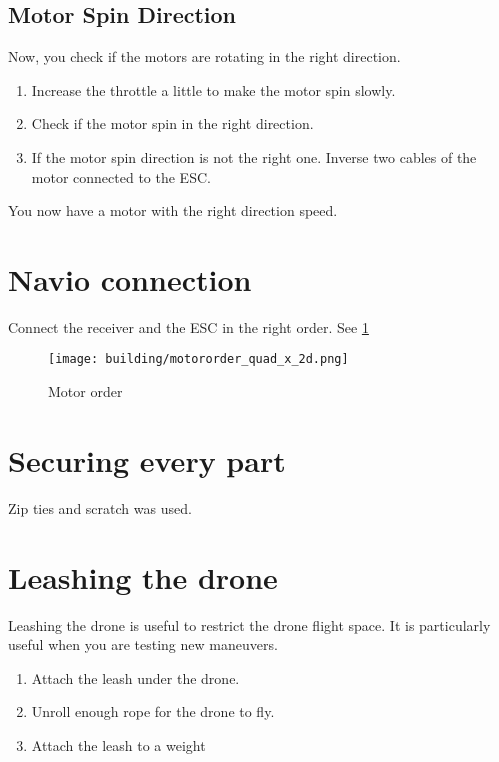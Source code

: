 \subsection{Motor Spin Direction}
Now, you check if the motors are rotating in the right direction.

\begin{enumerate}
    \item Increase the throttle a little to make the motor spin slowly.
    \item Check if the motor spin in the right direction.
    \item If the motor spin direction is not the right one. Inverse two cables of the motor connected to the ESC.
\end{enumerate}

You now have a motor with the right direction speed.

\section{Navio connection}
Connect the receiver and the ESC in the right order. See \ref{fig:motor_order}
\begin{figure}[!ht]
    \centering
    \texttt{[image: building/motororder\_quad\_x\_2d.png]}
    \caption{Motor order}
    \label{fig:motor_order}
\end{figure}

\section{Securing every part}
Zip ties and scratch was used.


\section{Leashing the drone}
Leashing the drone is useful to restrict the drone flight space. It is particularly useful when you are testing new maneuvers.
\begin{enumerate}
    \item Attach the leash under the drone.
    \item Unroll enough rope for the drone to fly.
    \item Attach the leash to a weight
\end{enumerate}
